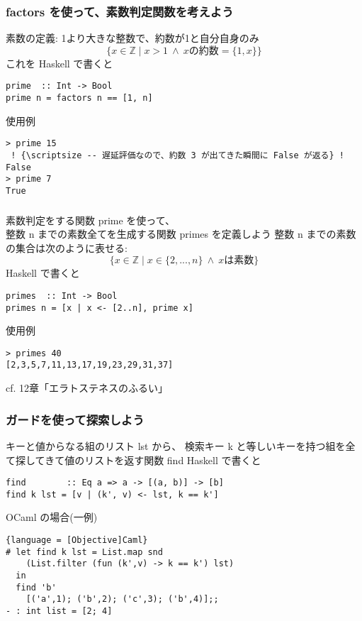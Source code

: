 \documentclass[dvipdfmx,cjk,xcolor=dvipsnames,envcountsect,notheorems,12pt]{beamer}
\theoremstyle{definition}
\begin{document}
\begin{frame}[fragile]
\frametitle{factors を使って、素数判定関数を考えよう}
素数の定義: 1より大きな整数で、約数が1と自分自身のみ
    \begin{equation*}
    \{ x \in \mathbb{Z} \mid x > 1 ~ \land ~ x \mbox{の約数} = \{ 1, x \} \}
    \end{equation*}
    これを Haskell で書くと
\begin{lstlisting}
prime  :: Int -> Bool
prime n = factors n == [1, n]
\end{lstlisting}
使用例
\begin{lstlisting}[escapechar=!]
> prime 15
 ! {\scriptsize -- 遅延評価なので、約数 3 が出てきた瞬間に False が返る} !
False
> prime 7
True
\end{lstlisting}
\end{frame}

\begin{frame}[fragile]
\frametitle{}
素数判定をする関数 prime を使って、 \\ 整数 n までの素数全てを生成する関数 primes を定義しよう
\vfill
整数 n までの素数の集合は次のように表せる:
    \begin{equation*}
    \{ x \in \mathbb{Z} \mid x \in \{2, ..., n\} ~ \land ~ x \mbox{は素数}\}
    \end{equation*}
    Haskell で書くと
\begin{lstlisting}
primes  :: Int -> Bool
primes n = [x | x <- [2..n], prime x]
\end{lstlisting}
使用例
\begin{lstlisting}
> primes 40
[2,3,5,7,11,13,17,19,23,29,31,37]
\end{lstlisting}
{\scriptsize cf. 12章「エラトステネスのふるい」}
\end{frame}


\begin{frame}[fragile]
\frametitle{ガードを使って探索しよう}
キーと値からなる組のリスト lst から、
検索キー k と等しいキーを持つ組を全て探してきて値のリストを返す関数 find
\vfill
Haskell で書くと 
\begin{lstlisting} 
find        :: Eq a => a -> [(a, b)] -> [b]
find k lst = [v | (k', v) <- lst, k == k']
\end{lstlisting}
OCaml の場合(一例)
\begin{lstlisting}{language = [Objective]Caml}
# let find k lst = List.map snd 
    (List.filter (fun (k',v) -> k == k') lst)
  in 
  find 'b' 
    [('a',1); ('b',2); ('c',3); ('b',4)];;
- : int list = [2; 4]
\end{lstlisting}
\end{frame}
\end{document}
